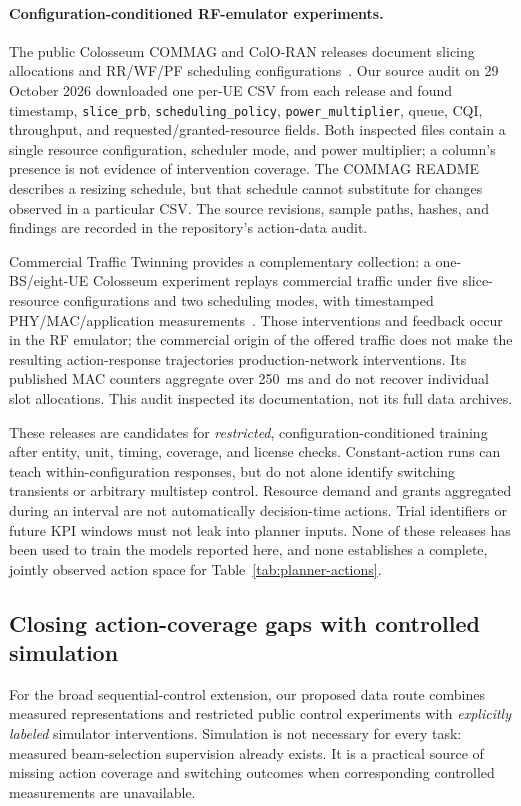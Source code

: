 \paragraph{Configuration-conditioned RF-emulator experiments.}
The public Colosseum COMMAG and ColO-RAN releases document slicing allocations
and RR/WF/PF scheduling configurations~\cite{commagdata,colorandata}.
Our source audit on 29 October 2026 downloaded one per-UE CSV from each release
and found timestamp, \texttt{slice\_prb}, \texttt{scheduling\_policy},
\texttt{power\_multiplier}, queue, CQI, throughput, and requested/granted-resource
fields. Both inspected files contain a single resource configuration,
scheduler mode, and power multiplier; a column's presence is not evidence of
intervention coverage. The COMMAG README describes a resizing schedule, but
that schedule cannot substitute for changes observed in a particular CSV.
The source revisions, sample paths, hashes, and findings are recorded in the
repository's action-data audit.

Commercial Traffic Twinning provides a complementary collection: a
one-BS/eight-UE Colosseum experiment replays commercial traffic under five
slice-resource configurations and two scheduling modes, with timestamped
PHY/MAC/application measurements~\cite{twinning2024}. Those interventions and
feedback occur in the RF emulator; the commercial origin of the offered traffic
does not make the resulting action-response trajectories production-network
interventions. Its published MAC counters aggregate over 250~ms and do not
recover individual slot allocations. This audit inspected its documentation,
not its full data archives.

These releases are candidates for \emph{restricted}, configuration-conditioned
training after entity, unit, timing, coverage, and license checks. Constant-action
runs can teach within-configuration responses, but do not alone identify
switching transients or arbitrary multistep control. Resource demand and grants
aggregated during an interval are not automatically decision-time actions.
Trial identifiers or future KPI windows must not leak into planner inputs.
None of these releases has been used to train the models reported here, and
none establishes a complete, jointly observed action space for Table~\ref{tab:planner-actions}.

\subsection{Closing action-coverage gaps with controlled simulation}
For the broad sequential-control extension, our proposed data route combines
measured representations and restricted public control experiments with
\emph{explicitly labeled} simulator interventions. Simulation is not necessary
for every task: measured beam-selection supervision already exists. It is a
practical source of missing action coverage and switching outcomes when
corresponding controlled measurements are unavailable.

